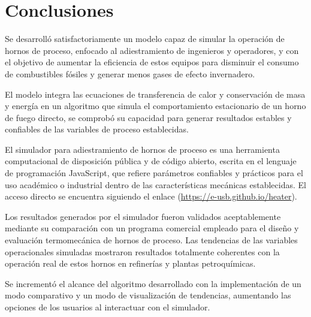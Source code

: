 \chapter*{Conclusiones}

    \par Se desarrolló satisfactoriamente un modelo capaz de simular la operación de hornos de proceso, enfocado al adiestramiento de ingenieros y operadores, y con el objetivo de aumentar la eficiencia de estos equipos para disminuir el consumo de combustibles fósiles y generar menos gases de efecto invernadero.

    \par El modelo integra las ecuaciones de transferencia de calor y conservación de masa y energía en un algoritmo que simula el comportamiento estacionario de un horno de fuego directo, se comprobó su capacidad para generar resultados estables y confiables de las variables de proceso establecidas.
    
    \par El simulador para adiestramiento de hornos de proceso es una herramienta computacional de disposición pública y de código abierto, escrita en el lenguaje de programación JavaScript, que refiere parámetros confiables y prácticos para el uso académico o industrial dentro de las características mecánicas establecidas. El acceso directo se encuentra siguiendo el enlace (\url{https://e-usb.github.io/heater}).
    
    \par Los resultados generados por el simulador fueron validados aceptablemente mediante su comparación con un programa comercial empleado para el diseño y evaluación termomecánica de hornos de proceso. Las tendencias de las variables operacionales simuladas mostraron resultados totalmente coherentes con la operación real de estos hornos en refinerías y plantas petroquímicas.

    \par Se incrementó el alcance del algoritmo desarrollado con la implementación de un modo comparativo y un modo de visualización de tendencias, aumentando las opciones de los usuarios al interactuar con el simulador.
